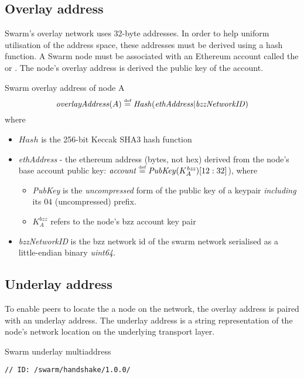 \subsection{Overlay address \statusyellow}

Swarm's overlay network uses 32-byte addresses. In order to help  uniform utilisation of the address space,  these addresses must be derived using a hash function. A Swarm node must be associated with an Ethereum account called the  or .
The node's overlay address is derived the public key of the account.

\begin{definition}{Swarm overlay address of node A}\label{def:overlay}
\begin{equation}
\mathit{overlayAddress}(A) \overset{\textrm{\tiny def}}{=} \mathit{Hash}(\mathit{ethAddress}|\mathit{bzzNetworkID})         
\end{equation}
where
\begin{itemize}
\item $\mathit{Hash}$ is the 256-bit Keccak SHA3 hash function
\item \emph{ethAddress} - the ethereum address  (bytes,  not hex) derived from the node's base account public key: $\mathit{account}\overset{\textrm{\tiny def}}{=}\mathit{PubKey}(K_A^\mathit{bzz})[12:32]$), where
    \begin{itemize}
    \item \emph{PubKey} is the \emph{uncompressed} form of the public key of a keypair \emph{including} its $04$ (uncompressed) prefix.
    \item $K_A^\mathit{bzz}$ refers to the node's bzz account key pair
    \end{itemize}
\item \emph{bzzNetworkID} is the bzz network id of the swarm network serialised as a little-endian binary \emph{uint64}.
\end{itemize}
\end{definition}

\subsection{Underlay address \statusyellow}

To enable peers to locate the a node on the network, the overlay address is paired with an underlay address. The underlay address is a string representation of the node's network location on the underlying transport layer. 

\begin{definition}{Swarm underlay multiaddress}\label{def:underlay}
\begin{lstlisting}[]
// ID: /swarm/handshake/1.0.0/
\end{lstlisting}
\end{definition}

